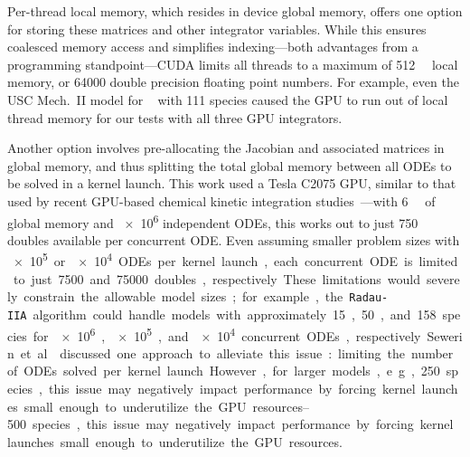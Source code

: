 \documentclass[preprint]{elsarticle}
\begin{document}
Per-thread local memory, which resides in device global memory, offers one option for storing these matrices and other integrator variables.
While this ensures coalesced memory access and simplifies indexing---both advantages from a programming standpoint---CUDA limits all threads to a maximum of \SI{512}{\kilo\byte} local memory, or \num{64000} double precision floating point numbers.
For example, even the USC Mech.~II model for ~\cite{Wang:2007} with 111 species caused the GPU to run out of local thread memory for our tests with all three GPU integrators.

Another option involves pre-allocating the Jacobian and associated matrices in global memory, and thus splitting the total global memory between all ODEs to be solved in a kernel launch.
This work used a Tesla C2075 GPU, similar to that used by recent GPU-based chemical kinetic integration studies~\cite{Shi:2011aa,Niemeyer:2011aa,Shi:2012aa,Le2013596,Stone:2013aa,Niemeyer:2014aa}---with \SI{6}{\giga\byte} of global memory and \num{e6} independent ODEs, this works out to just 750 doubles available per concurrent ODE.
Even assuming smaller problem sizes with \SI{e5} or \SI{e4} ODEs per kernel launch, each concurrent ODE is limited to just \num{7500} and \num{75000} doubles, respectively.
These limitations would severely constrain the allowable model sizes; for example, the \texttt{Radau-IIA} algorithm could handle models with approximately 15, 50, and 158 species for \num{e6}, \num{e5}, and \num{e4} concurrent ODEs, respectively.
Sewerin et al.~\cite{Sewerin20151375} discussed one approach to alleviate this issue: limiting the number of ODEs solved per kernel launch. 
However, for larger models, e.g., \SIrange{250}{500} species, this issue may negatively impact performance by forcing kernel launches small enough to underutilize the GPU resources.
\end{document}
